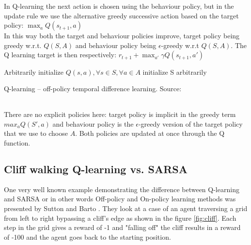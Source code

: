 
In Q-learning the  next action is chosen using the behaviour policy, but in the update rule we use the alternative greedy successive action based on the target policy: $\max_a Q(s_{t+1}, a)$\\

In this way both the target and behaviour policies improve, target policy being greedy w.r.t. $Q(S, A)$ and behaviour policy being $\epsilon$-greedy w.r.t $Q(S, A)$. The Q learning target is then respectively: $r_{t+1} + \max_{a'} \gamma Q(s_{t+1}, a')$\\


\begin{algorithm}[H]
\SetAlgoLined
Arbitrarily initialize $Q(s, a), \forall s \in S, \forall a \in A$\;
initialize S arbitrarily\;
\caption{Q-learning -- off-policy temporal difference learning. Source: \cite{lecture_mfc} }
\end{algorithm}\\


There are no explicit policies here: target policy is implicit in the greedy term $max_a Q(S', a)$ and behaviour policy is the $\epsilon$-greedy version of the target policy that we use to choose $A$. Both policies are updated at once through the 
Q function.

\subsection{Cliff walking  Q-learning vs. SARSA}
One very well known example demonstrating the difference between
Q-learning and SARSA or in other words Off-policy and On-policy learning methods was presented by Sutton and Barto \cite{sutton_barto}. They look at a case of an agent traversing a grid from left to right bypassing a cliff's edge as shown in the figure \ref{fig:cliff}. Each
step in the grid gives a reward of -1 and "falling off" 
the cliff results in a reward of -100 and the agent goes
back to the starting position.

